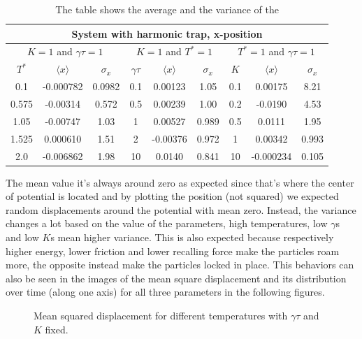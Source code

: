 \documentclass[../main.tex]{subfiles}
\begin{document}
\begin{table}[!ht]
    \centering
    \begin{tabular}{ccc|ccc|ccc}
        \toprule
        \multicolumn{9}{c}{\textbf{System with harmonic trap, x-position}}\\
        \midrule
        \multicolumn{3}{c|}{$K=1$ and $\gamma\tau=1$} & \multicolumn{3}{c|}{$K=1$ and $T^*=1$} & \multicolumn{3}{c}{$T^*=1$ and $\gamma\tau=1$}\\
        $T^*$&$\langle x\rangle$&$\sigma_x$& $\gamma\tau$ &$\langle x\rangle$&$\sigma_x$& $K$ &$\langle x\rangle$&$\sigma_x$\\
        \hline
        0.1    &   -0.000782  &     0.0982  & 0.1   &  0.00123  &  1.05  & 0.1  &  0.00175   &  8.21\\
        0.575  &   -0.00314   &     0.572   & 0.5   &  0.00239  &  1.00  & 0.2  &  -0.0190   &  4.53\\
        1.05   &   -0.00747   &     1.03    & 1     &  0.00527  &  0.989 & 0.5  &  0.0111    &  1.95\\
        1.525  &    0.000610  &     1.51    & 2     & -0.00376  &  0.972 & 1    &  0.00342   &  0.993\\
        2.0    &   -0.006862  &     1.98    & 10    &  0.0140   &  0.841 & 10   &  -0.000234 &  0.105\\
        \hline
    \end{tabular}
    \caption{The table shows the average and the variance of the }
    \label{tab: ex_11_VHO_res}
\end{table}
The mean value it's always around zero as expected since that's where the center of potential is located and by plotting the position (not squared) we expected random displacements around the potential with mean zero. Instead, the variance changes a lot based on the value of the parameters, high temperatures, low $\gamma$s and low $K$s mean higher variance. This is also expected because respectively higher energy, lower friction and lower recalling force make the particles roam more, the opposite instead make the particles locked in place. This behaviors can also be seen in the images of the mean square displacement and its distribution over time (along one axis) for all three parameters in the following figures.

\begin{figure}[!ht]
    \centering
    \begin{subfigure}{.85\textwidth}
        \centering
        
    \end{subfigure}
    \caption{Mean squared displacement for different temperatures with $\gamma\tau$ and $K$ fixed.}
    \label{fig: ex_11_VHO_temps}
\end{figure}
\end{document}
